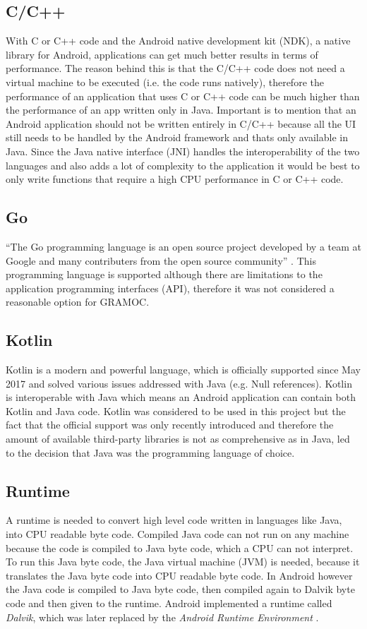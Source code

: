 \subsection{C/C++}
With C or C++ code and the Android native development kit (NDK), a native library for Android, applications can get much better results in terms of performance. The reason behind this is that the C/C++ code does not need a virtual machine to be executed (i.e. the code runs natively), therefore the performance of an application that uses C or C++ code can be much higher than the performance of an app written only in Java. Important is to mention that an Android application should not be written entirely in C/C++ because all the UI still needs to be handled by the Android framework and thats only available in Java. Since the Java native interface (JNI) handles the interoperability of the two languages and also adds a lot of complexity to the application it would be best to only write functions that require a high CPU performance in C or C++ code.

\subsection{Go}
``The Go programming language is an open source project developed by a team at Google and many contributers from the open source community'' \autocite{GoProject}. This programming language is supported although there are limitations to the application programming interfaces (API), therefore it was not considered a reasonable option for GRAMOC.

\subsection{Kotlin}
Kotlin is a modern and powerful language, which is officially supported since May 2017 and solved various issues addressed with Java (e.g. Null references). Kotlin is interoperable with Java which means an Android application can contain both Kotlin and Java code. Kotlin was considered to be used in this project but the fact that the official support was only recently introduced and therefore the amount of available third-party libraries is not as comprehensive as in Java, led to the decision that Java was the programming language of choice.

\subsection{Runtime}
A runtime is needed to convert high level code written in languages like Java, into CPU readable byte code. Compiled Java code can not run on any machine because the code is compiled to Java byte code, which a CPU can not interpret. To run this Java byte code, the Java virtual machine (JVM) is needed, because it translates the Java byte code into CPU readable byte code. In Android however the Java code is compiled to Java byte code, then compiled again to Dalvik byte code and then given to the runtime. Android implemented a runtime called \textit{Dalvik}, which was later replaced by the \textit{Android Runtime Environment} \autocite{artanddalvik}.

